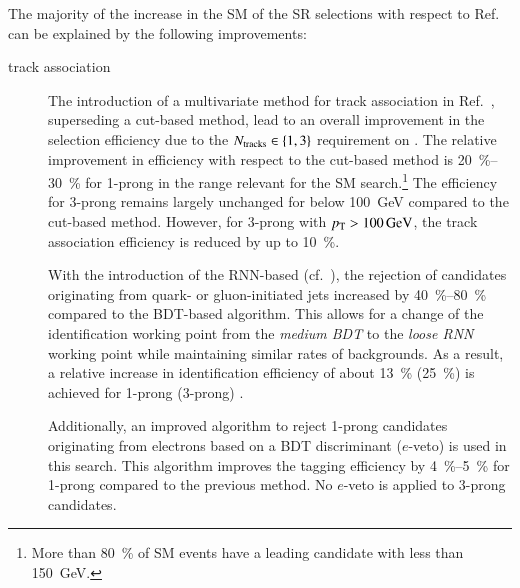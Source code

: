 The majority of the increase in the SM \HH \AccTimesEff of the SR selections
with respect to Ref.~\cite{HIGG-2016-16-witherratum} can be explained by the
following improvements:
\begin{description}

\item[\tauhadvis track association] The introduction of a multivariate method
  for \tauhadvis track association in Ref.~\cite{duschinger}, superseding a
  cut-based method, lead to an overall improvement in the \tauhadvis selection
  efficiency due to the $N_{\text{tracks}} \in \{1, 3\}$ requirement on \tauhadvis. The
  relative improvement in efficiency with respect to the cut-based method is
  \SIrange{20}{30}{\percent} for 1-prong \tauhadvis in the \tauhadvis \pT range
  relevant for the SM \HH search.\footnote{More than \SI{80}{\percent} of SM \HH
    events have a leading \tauhadvis candidate with \pT less than
    \SI{150}{\GeV}.} The efficiency for 3-prong \tauhadvis remains largely
  unchanged for \tauhadvis \pT below \SI{100}{\GeV} compared to the cut-based
  method. However, for 3-prong \tauhadvis with $\pT > \SI{100}{\GeV}$, the track
  association efficiency is reduced by up to \SI{10}{\percent}.

\item[\Tauid] With the introduction of the RNN-based \tauid
  (cf.~), the rejection of \tauhadvis candidates originating
  from quark- or gluon-initiated jets increased by \SIrange{40}{80}{\percent}
  compared to the BDT-based algorithm. This allows for a change of the
  identification working point from the \emph{medium BDT} to the \emph{loose
    RNN} working point while maintaining similar rates of \faketauhadvis
  backgrounds. As a result, a relative increase in \tauhadvis identification
  efficiency of about \SI{13}{\percent} (\SI{25}{\percent}) is achieved for
  1-prong (3-prong) \tauhadvis.

  Additionally, an improved algorithm to reject 1-prong \tauhadvis candidates
  originating from electrons based on a BDT discriminant ($e$-veto) is used
  in this search. This algorithm improves the tagging efficiency by
  \SIrange{4}{5}{\percent} for 1-prong \tauhadvis compared to the previous
  method. No $e$-veto is applied to 3-prong \tauhadvis candidates.



\end{description}
